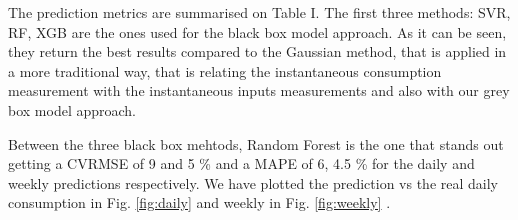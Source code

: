 \documentclass[10pt, conference, compsocconf]{IEEEtran}
\begin{document}
The prediction metrics are summarised on Table I. The first three methods: SVR, RF, XGB are the ones used for the black box model approach. As it can be seen, they return the best results compared to the Gaussian method, that is applied in a more traditional way, that is relating the instantaneous consumption measurement with the instantaneous inputs measurements and also with our grey box model approach. 

Between the three black box mehtods, Random Forest is the one that stands out getting a CVRMSE of 9 and 5 \%  and a MAPE of 6, 4.5 \% for the daily and weekly predictions respectively. We have plotted the prediction vs the real daily consumption in Fig. \ref{fig:daily} and weekly in Fig. \ref{fig:weekly} .

\begin{center}
\end{center}




\end{document}
